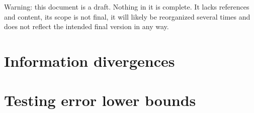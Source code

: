 %

Warning: this document is a draft. Nothing in it is complete. It lacks references and content, its scope is not final, it will likely be reorganized several times and does not reflect the intended final version in any way.




\chapter{Information divergences}












\chapter{Testing error lower bounds}







\appendix





